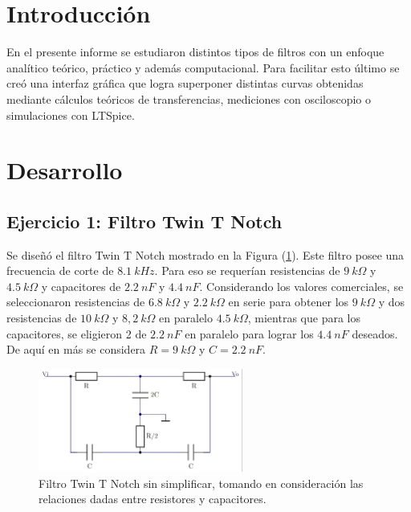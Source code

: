 \documentclass[a4paper]{article}
\begin{document}




\section{Introducción}

En el presente informe se estudiaron distintos tipos de filtros con un enfoque analítico teórico, práctico y además computacional. Para facilitar esto último se creó una interfaz gráfica que logra superponer distintas curvas obtenidas mediante cálculos teóricos de transferencias, mediciones con osciloscopio o simulaciones con LTSpice.

\section{Desarrollo}

\subsection{Ejercicio 1: Filtro Twin T Notch}

Se diseñó el filtro Twin T Notch mostrado en la Figura (\ref{fig:filtroinicial}). Este filtro posee una frecuencia de corte de $ 8.1 \ kHz $. Para eso se requerían resistencias de $ 9 \ k\Omega $ y $ 4.5 \ k\Omega $ y capacitores de $ 2.2 \ nF $ y $ 4.4 \ nF $. Considerando los valores comerciales, se seleccionaron resistencias de $ 6.8 \ k\Omega $ y $ 2.2 \ k\Omega $ en serie para obtener los $ 9 \ k\Omega $ y dos resistencias de $ 10 \ k\Omega $ y $ 8,2 \ k\Omega $ en paralelo $ 4.5 \ k\Omega $, mientras que para los capacitores, se eligieron 2 de $ 2.2 \ nF $ en paralelo para lograr los $ 4.4 \ nF $ deseados.
De aquí en más se considera $ R = 9 \ k\Omega $ y $ C = 2.2 \ nF $.

\begin{figure}[H]
	\centering
	\includegraphics[width=0.6\textwidth ,trim={0 0.1cm  0.5cm 0},clip]{ej1inicial.jpg}
\caption{Filtro Twin T Notch sin simplificar, tomando en consideración las relaciones dadas entre resistores y capacitores.}
	\label{fig:filtroinicial}
\end{figure}
\end{document}
